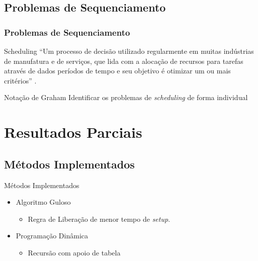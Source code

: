 \documentclass{beamer}
\begin{document}
\subsection{Problemas de Sequenciamento}
\begin{frame}
\frametitle{Problemas de Sequenciamento}
\begin{block}{Scheduling}
“Um processo de decisão utilizado regularmente em muitas indústrias de manufatura e de serviços, que lida com a alocação de recursos para tarefas através de dados períodos de tempo e seu objetivo é otimizar um ou mais critérios” \cite{pinedo2015scheduling}. 
\end{block}

\begin{block}{Notação de Graham}
Identificar os problemas de \textit{scheduling} de forma individual
\end{block}

\end{frame}    

\section{Resultados Parciais}
\begin{frame}
\tableofcontents[ 
    currentsubsection, 
    hideothersubsections, 
    sectionstyle=show/shaded
    ] 
\end{frame}
\subsection{Métodos Implementados}
\begin{frame}{Métodos Implementados}
\Large
\begin{itemize}
\item Algoritmo Guloso
\begin{itemize}
\large
\item Regra de Liberação de menor tempo de \textit{setup}.\cite{pacheco2001adoccao} 
\end{itemize}
\bigskip
\item Programação Dinâmica
\begin{itemize}
\large
\item Recursão com apoio de tabela 
\end{itemize}
\end{itemize}

\end{frame}
\end{document}
